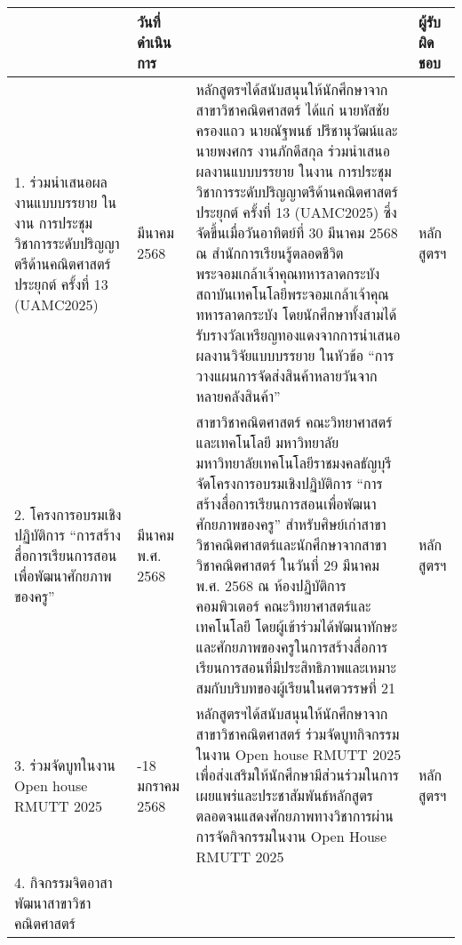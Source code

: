 \begin{longtable}{|>{\raggedright}p{}|>{\centering}p{}|>{\raggedright}p{}|>{\centering\arraybackslash}p{}|}
	\hline
	\centering{\textbf{โครงการ/กิจกรรม}}   & \textbf{วันที่ดำเนินการ} &  \centering{\textbf{ผลการดำเนินงาน}} & \textbf{ผู้รับผิดชอบ}  \\
	 \hline
	 \endhead
	1. ร่วมนำเสนอผลงานแบบบรรยาย ในงาน การประชุมวิชาการระดับปริญญาตรีด้านคณิตศาสตร์ประยุกต์ ครั้งที่ 13 (UAMC2025)	   & 30 มีนาคม 2568  & หลักสูตรฯได้สนับสนุนให้นักศึกษาจากสาขาวิชาคณิตศาสตร์  ได้แก่ นายหัสชัย ครองแถว นายณัฐพนธ์ ปรีชานุวัฒน์และนายพงศกร งานภักดีสกุล ร่วมนำเสนอผลงานแบบบรรยาย ในงาน การประชุมวิชาการระดับปริญญาตรีด้านคณิตศาสตร์ประยุกต์ ครั้งที่ 13 (UAMC2025)	  ซึ่งจัดขึ้นเมื่อวันอาทิตย์ที่ 30 มีนาคม 2568 ณ สำนักการเรียนรู้ตลอดชีวิตพระจอมเกล้าเจ้าคุณทหารลาดกระบัง สถาบันเทคโนโลยีพระจอมเกล้าเจ้าคุณทหารลาดกระบัง  โดยนักศึกษาทั้งสามได้รับรางวัลเหรียญทองแดงจากการนำเสนอผลงานวิจัยแบบบรรยาย ในหัวข้อ ``การวางแผนการจัดส่งสินค้าหลายวันจากหลายคลังสินค้า''
	&  หลักสูตรฯ  \\ \hline
	2. โครงการอบรมเชิงปฏิบัติการ ``การสร้างสื่อการเรียนการสอนเพื่อพัฒนาศักยภาพของครู'' &  29 มีนาคม พ.ศ. 2568  & สาขาวิชาคณิตศาสตร์ คณะวิทยาศาสตร์และเทคโนโลยี มหาวิทยาลัย มหาวิทยาลัยเทคโนโลยีราชมงคลธัญบุรี จัดโครงการอบรมเชิงปฏิบัติการ ``การสร้างสื่อการเรียนการสอนเพื่อพัฒนาศักยภาพของครู'' สำหรับศิษย์เก่าสาขาวิชาคณิตศาสตร์และนักศึกษาจากสาขาวิชาคณิตศาสตร์   ในวันที่ 29 มีนาคม พ.ศ. 2568  ณ ห้องปฏิบัติการคอมพิวเตอร์ คณะวิทยาศาสตร์และเทคโนโลยี  โดยผู้เข้าร่วมได้พัฒนาทักษะและศักยภาพของครูในการสร้างสื่อการเรียนการสอนที่มีประสิทธิภาพและเหมาะสมกับบริบทของผู้เรียนในศตวรรษที่ 21 & หลักสูตรฯ \\ \hline
	3. ร่วมจัดบูทในงาน Open house RMUTT 2025 & 17-18 มกราคม 2568  & หลักสูตรฯได้สนับสนุนให้นักศึกษาจากสาขาวิชาคณิตศาสตร์  ร่วมจัดบูทกิจกรรมในงาน Open house RMUTT 2025 เพื่อส่งเสริมให้นักศึกษามีส่วนร่วมในการเผยแพร่และประชาสัมพันธ์หลักสูตร ตลอดจนแสดงศักยภาพทางวิชาการผ่านการจัดกิจกรรมในงาน Open House RMUTT 2025 &  หลักสูตรฯ\\ \hline
	4. กิจกรรมจิตอาสาพัฒนาสาขาวิชาคณิตศาสตร์ &   &   &  \\ \hline
\end{longtable}

